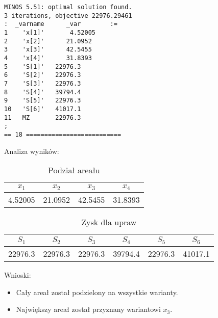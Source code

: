 \documentclass{article}
\begin{document}
\lstset{language=AMPL}
\begin{lstlisting}[caption={Wynik modlu z solwerem MINOS.},label=DescriptiveLabel]
MINOS 5.51: optimal solution found.
3 iterations, objective 22976.29461
:  _varname      _var        :=
1    'x[1]'       4.52005
2    'x[2]'      21.0952
3    'x[3]'      42.5455
4    'x[4]'      31.8393
5    'S[1]'   22976.3
6    'S[2]'   22976.3
7    'S[3]'   22976.3
8    'S[4]'   39794.4
9    'S[5]'   22976.3
10   'S[6]'   41017.1
11   MZ       22976.3
;
== 18 ==========================
\end{lstlisting}

\noindent

Analiza wyników:

\begin{table}[H]
  \begin{center}
    \begin{tabular}{|c|c|c|c|}
      \hline
      $x_1$ & $x_2$ & $x_3$ & $x_4$ \\
      \hline
      4.52005 & 21.0952 & 42.5455 & 31.8393 \\
      \hline
    \end{tabular} 
    \caption{\label{table:podzialarealu3} Podział areału}
  \end{center}
\end{table}

\begin{table}[H]
  \begin{center}
    \begin{tabular}{|c|c|c|c|c|c|}
      \hline
      $S_1$ & $S_2$ & $S_3$ & $S_4$ & $S_5$ & $S_6$ \\
      \hline
      22976.3 & 22976.3 & 22976.3 & 39794.4 & 22976.3 & 41017.1 \\
      \hline
    \end{tabular} 
    \caption{\label{table:zyskdlaupraw3} Zysk dla upraw}
  \end{center}
\end{table}

\noindent
Wnioski:

\begin{itemize}
    \item Cały areał został podzielony na wszystkie warianty.
    \item Największy areał został przyznany wariantowi $x_3$.
\end{itemize}
\end{document}
